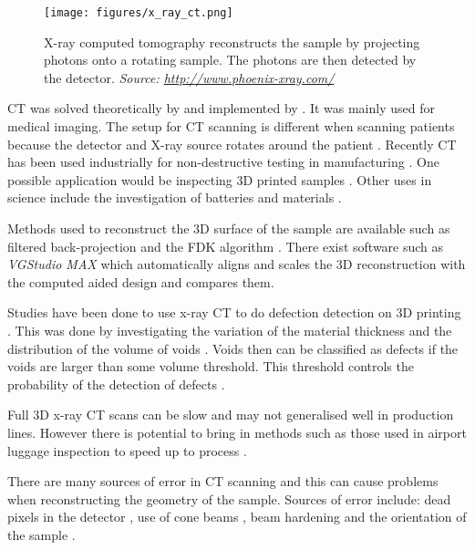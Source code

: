 \begin{figure}
	\centering
	\texttt{[image: figures/x\_ray\_ct.png]}
	\caption{X-ray computed tomography reconstructs the sample by projecting photons onto a rotating sample. The photons are then detected by the detector. \emph{Source: \url{http://www.phoenix-xray.com/}}}
	\label{fig:x_ray_ct}
\end{figure}

CT was solved theoretically by \cite{cormack1973reconstruction} and implemented by \cite{hounsfield1973computerized} \citep{hounsfield1980computed}. It was mainly used for medical imaging. The setup for CT scanning is different when scanning patients because the detector and X-ray source rotates around the patient \citep{cantatore2011introduction}. Recently CT has been used industrially for non-destructive testing in manufacturing \citep{cantatore2011introduction}. One possible application would be inspecting 3D printed samples \citep{villarraga2015assessing}. Other uses in science include the investigation of batteries \citep{o2017investigating} and materials \citep{wang2017x} \citep{zhang2016x}.

Methods used to reconstruct the 3D surface of the sample are available such as filtered back-projection \citep{brooks1976principles} and the FDK algorithm \citep{feldkamp1984practical}. There exist software such as \emph{VGStudio MAX} \citep{reinhart2008industrial} which automatically aligns and scales the 3D reconstruction with the computed aided design and compares them.

Studies have been done to use x-ray CT to do defection detection on 3D printing \citep{kim2016inspection} \citep{villarraga2015assessing}. This was done by investigating the variation of the material thickness and the distribution of the volume of voids \citep{villarraga2015assessing}. Voids then can be classified as defects if the voids are larger than some volume threshold. This threshold controls the probability of the detection of defects \citep{amrhein2014characterization} \citep{gandossi2010probability}.

Full 3D x-ray CT scans can be slow and may not generalised well in production lines. However there is potential to bring in methods such as those used in airport luggage inspection to speed up to process \citep{warnett2016towards}.

There are many sources of error in CT scanning \citep{cantatore2011introduction} and this can cause problems when reconstructing the geometry of the sample. Sources of error include: dead pixels in the detector \citep{brettschneider2014spatial}, use of cone beams \citep{sun2016applications}, beam hardening and the orientation of the sample \citep{corcoran2016observations}.

